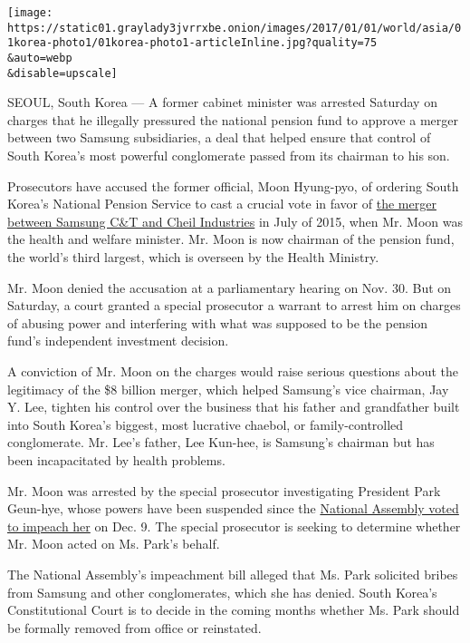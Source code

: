 \texttt{[image: https://static01.graylady3jvrrxbe.onion/images/2017/01/01/world/asia/01korea-photo1/01korea-photo1-articleInline.jpg?quality=75\\\&auto=webp\\\&disable=upscale]}

SEOUL, South Korea --- A former cabinet minister was arrested Saturday
on charges that he illegally pressured the national pension fund to
approve a merger between two Samsung subsidiaries, a deal that helped
ensure that control of South Korea's most powerful conglomerate passed
from its chairman to his son.

Prosecutors have accused the former official, Moon Hyung-pyo, of
ordering South Korea's National Pension Service to cast a crucial vote
in favor of
\href{http://www.nytimes3xbfgragh.onion/2015/07/18/business/dealbook/samsung-ct-shareholders-back-cheil-industries-merger-defying-activist-hedge-fund-elliott-associates.html}{the
merger between Samsung C\&T and Cheil Industries} in July of 2015, when
Mr. Moon was the health and welfare minister. Mr. Moon is now chairman
of the pension fund, the world's third largest, which is overseen by the
Health Ministry.

Mr. Moon denied the accusation at a parliamentary hearing on Nov. 30.
But on Saturday, a court granted a special prosecutor a warrant to
arrest him on charges of abusing power and interfering with what was
supposed to be the pension fund's independent investment decision.

A conviction of Mr. Moon on the charges would raise serious questions
about the legitimacy of the \$8 billion merger, which helped Samsung's
vice chairman, Jay Y. Lee, tighten his control over the business that
his father and grandfather built into South Korea's biggest, most
lucrative chaebol, or family-controlled conglomerate. Mr. Lee's father,
Lee Kun-hee, is Samsung's chairman but has been incapacitated by health
problems.

Mr. Moon was arrested by the special prosecutor investigating President
Park Geun-hye, whose powers have been suspended since the
\href{https://www.nytimes3xbfgragh.onion/2016/12/09/world/asia/south-korea-president-park-geun-hye-impeached.html}{National
Assembly voted to impeach her} on Dec. 9. The special prosecutor is
seeking to determine whether Mr. Moon acted on Ms. Park's behalf.

The National Assembly's impeachment bill alleged that Ms. Park solicited
bribes from Samsung and other conglomerates, which she has denied. South
Korea's Constitutional Court is to decide in the coming months whether
Ms. Park should be formally removed from office or reinstated.

